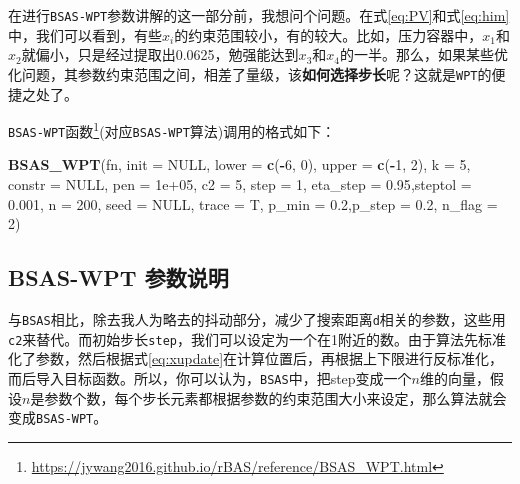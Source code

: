 \documentclass[]{ctexbook}
\newenvironment{Shaded}{\begin{snugshade}}{\end{snugshade}}
\newcommand{\KeywordTok}[1]{\textcolor[rgb]{0.13,0.29,0.53}{\textbf{#1}}}
\newcommand{\DataTypeTok}[1]{\textcolor[rgb]{0.13,0.29,0.53}{#1}}
\newcommand{\DecValTok}[1]{\textcolor[rgb]{0.00,0.00,0.81}{#1}}
\newcommand{\FloatTok}[1]{\textcolor[rgb]{0.00,0.00,0.81}{#1}}
\newcommand{\OtherTok}[1]{\textcolor[rgb]{0.56,0.35,0.01}{#1}}
\newcommand{\OperatorTok}[1]{\textcolor[rgb]{0.81,0.36,0.00}{\textbf{#1}}}
\newcommand{\NormalTok}[1]{#1}
\renewcommand{\href}[2]{#2\footnote{\url{#1}}}
\theoremstyle{definition}
\theoremstyle{definition}
\theoremstyle{definition}
\theoremstyle{remark}
\begin{document}
在进行\texttt{BSAS-WPT}参数讲解的这一部分前，我想问个问题。在式\eqref{eq:PV}和式\eqref{eq:him}中，我们可以看到，有些\(x_i\)的约束范围较小，有的较大。比如，压力容器中，\(x_1\)和\(x_2\)就偏小，只是经过提取出0.0625，勉强能达到\(x_3\)和\(x_4\)的一半。那么，如果某些优化问题，其参数约束范围之间，相差了量级，该\textbf{如何选择步长}呢？这就是\texttt{WPT}的便捷之处了。

\href{https://jywang2016.github.io/rBAS/reference/BSAS_WPT.html}{\texttt{BSAS-WPT}函数}(对应\texttt{BSAS-WPT}算法)调用的格式如下：

\begin{Shaded}
\begin{Highlighting}[]
\KeywordTok{BSAS_WPT}\NormalTok{(fn, }
         \DataTypeTok{init =} \OtherTok{NULL}\NormalTok{, }
         \DataTypeTok{lower =} \KeywordTok{c}\NormalTok{(}\OperatorTok{-}\DecValTok{6}\NormalTok{, }\DecValTok{0}\NormalTok{), }\DataTypeTok{upper =} \KeywordTok{c}\NormalTok{(}\OperatorTok{-}\DecValTok{1}\NormalTok{, }\DecValTok{2}\NormalTok{),}
         \DataTypeTok{k =} \DecValTok{5}\NormalTok{, }\DataTypeTok{constr =} \OtherTok{NULL}\NormalTok{, }\DataTypeTok{pen =} \FloatTok{1e+05}\NormalTok{, }
         \DataTypeTok{c2 =} \DecValTok{5}\NormalTok{, }
         \DataTypeTok{step =} \DecValTok{1}\NormalTok{, }\DataTypeTok{eta_step =} \FloatTok{0.95}\NormalTok{,}\DataTypeTok{steptol =} \FloatTok{0.001}\NormalTok{, }
         \DataTypeTok{n =} \DecValTok{200}\NormalTok{, }\DataTypeTok{seed =} \OtherTok{NULL}\NormalTok{, }\DataTypeTok{trace =}\NormalTok{ T, }
         \DataTypeTok{p_min =} \FloatTok{0.2}\NormalTok{,}\DataTypeTok{p_step =} \FloatTok{0.2}\NormalTok{, }\DataTypeTok{n_flag =} \DecValTok{2}\NormalTok{)}
\end{Highlighting}
\end{Shaded}

\subsection{BSAS-WPT 参数说明}\label{bsaswptparms}

与\texttt{BSAS}相比，除去我人为略去的抖动部分，减少了搜索距离\texttt{d}相关的参数，这些用\texttt{c2}来替代。而初始步长\texttt{step}，我们可以设定为一个在1附近的数。由于算法先标准化了参数，然后根据式\eqref{eq:xupdate}在计算位置后，再根据上下限进行反标准化，而后导入目标函数。所以，你可以认为，\texttt{BSAS}中，把step变成一个\(n\)维的向量，假设\(n\)是参数个数，每个步长元素都根据参数的约束范围大小来设定，那么算法就会变成\texttt{BSAS-WPT}。
\end{document}
